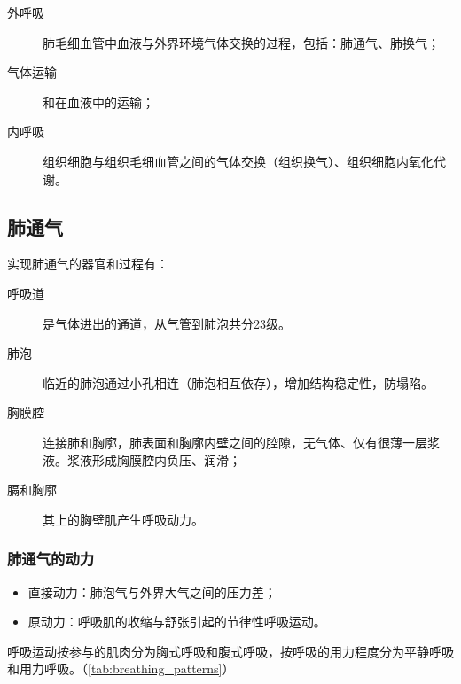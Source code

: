 \begin{description}
	\item[外呼吸] 肺毛细血管中血液与外界环境气体交换的过程，包括：肺通气、肺换气；
	\item[气体运输] 和在血液中的运输；
	\item[内呼吸] 组织细胞与组织毛细血管之间的气体交换（组织换气）、组织细胞内氧化代谢。
\end{description}

\subsection{肺通气}

实现肺通气的器官和过程有：
\begin{description}
	\item[呼吸道] 是气体进出的通道，从气管到肺泡共分23级。
	\item[肺泡] 临近的肺泡通过小孔相连（肺泡相互依存），增加结构稳定性，防塌陷。
	\item[胸膜腔] 连接肺和胸廓，肺表面和胸廓内壁之间的腔隙，无气体、仅有很薄一层浆液。浆液形成胸膜腔内负压、润滑；
	\item[膈和胸廓] 其上的胸壁肌产生呼吸动力。
\end{description}

\subsubsection{肺通气的动力}

\begin{itemize}
	\item 直接动力：肺泡气与外界大气之间的压力差；
	\item 原动力：呼吸肌的收缩与舒张引起的节律性呼吸运动。
\end{itemize}

呼吸运动按参与的肌肉分为胸式呼吸和腹式呼吸，按呼吸的用力程度分为平静呼吸和用力呼吸。（\autoref{tab:breathing_patterns}）


